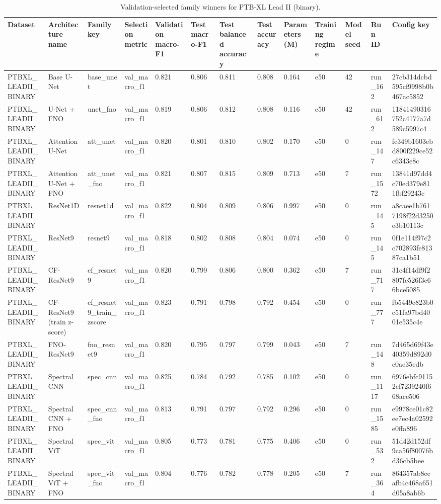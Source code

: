 \begin{table}
\caption{Validation-selected family winners for PTB-XL Lead II (binary).}
\label{tab:ptbxl_leadii_binary_best_model_performance}
\begin{tabular}{lllllllllllll}
\toprule
Dataset & Architecture name & Family key & Selection metric & Validation macro-F1 & Test macro-F1 & Test balanced accuracy & Test accuracy & Parameters (M) & Training regime & Model seed & Run ID & Config key \\
\midrule
PTBXL\_LEADII\_BINARY & Base U-Net & base\_unet & val\_macro\_f1 & 0.821 & 0.806 & 0.811 & 0.808 & 0.164 & e50 & 42 & run\_162 & 27cb314dcbd595cf9998b0b467ac5852 \\
PTBXL\_LEADII\_BINARY & U-Net + FNO & unet\_fno & val\_macro\_f1 & 0.819 & 0.806 & 0.812 & 0.808 & 0.116 & e50 & 42 & run\_612 & 11841490316752c4177a7d589c5997c4 \\
PTBXL\_LEADII\_BINARY & Attention U-Net & att\_unet & val\_macro\_f1 & 0.820 & 0.801 & 0.810 & 0.802 & 0.170 & e50 & 0 & run\_147 & fc349b1603ebd800f229ce52c6343e8c \\
PTBXL\_LEADII\_BINARY & Attention U-Net + FNO & att\_unet\_fno & val\_macro\_f1 & 0.821 & 0.807 & 0.815 & 0.809 & 0.713 & e50 & 7 & run\_1572 & 13841d97dd4c70ed379e811fbf29243c \\
PTBXL\_LEADII\_BINARY & ResNet1D & resnet1d & val\_macro\_f1 & 0.822 & 0.804 & 0.809 & 0.806 & 0.997 & e50 & 0 & run\_145 & a8caee1b7617198f22d3250e3b10113c \\
PTBXL\_LEADII\_BINARY & ResNet9 & resnet9 & val\_macro\_f1 & 0.818 & 0.802 & 0.808 & 0.804 & 0.074 & e50 & 0 & run\_145 & 0f1e114f97c2c702893fe81387ca1b51 \\
PTBXL\_LEADII\_BINARY & CF-ResNet9 & cf\_resnet9 & val\_macro\_f1 & 0.820 & 0.799 & 0.806 & 0.800 & 0.362 & e50 & 7 & run\_717 & 31c4f14df9f2807fe526f3c66bce5085 \\
PTBXL\_LEADII\_BINARY & CF-ResNet9 (train z-score) & cf\_resnet9\_train\_zscore & val\_macro\_f1 & 0.823 & 0.791 & 0.798 & 0.792 & 0.454 & e50 & 0 & run\_777 & fb5449c823b0c51fa97bd4001e535c4e \\
PTBXL\_LEADII\_BINARY & FNO-ResNet9 & fno\_resnet9 & val\_macro\_f1 & 0.820 & 0.795 & 0.797 & 0.799 & 0.043 & e50 & 7 & run\_148 & 7d465d69f43e40359d892d0c0ae35edb \\
PTBXL\_LEADII\_BINARY & Spectral CNN & spec\_cnn & val\_macro\_f1 & 0.825 & 0.784 & 0.792 & 0.785 & 0.102 & e50 & 0 & run\_1117 & 6976ebfc91152cf7239240f668ace506 \\
PTBXL\_LEADII\_BINARY & Spectral CNN + FNO & spec\_cnn\_fno & val\_macro\_f1 & 0.813 & 0.791 & 0.797 & 0.792 & 0.296 & e50 & 0 & run\_1585 & e9978ce01c82ee7ec4a02592e0ffa896 \\
PTBXL\_LEADII\_BINARY & Spectral ViT & spec\_vit & val\_macro\_f1 & 0.805 & 0.773 & 0.781 & 0.775 & 0.406 & e50 & 0 & run\_532 & 51d42d152df9ca56f80076bd36cb5bee \\
PTBXL\_LEADII\_BINARY & Spectral ViT + FNO & spec\_vit\_fno & val\_macro\_f1 & 0.804 & 0.776 & 0.782 & 0.778 & 0.205 & e50 & 7 & run\_364 & 864357ab8ceafb4c468a651d05a8ab6b \\
\bottomrule
\end{tabular}
\end{table}

